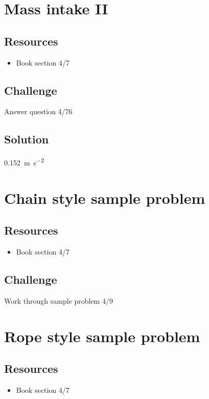 \newpage
\section{Mass intake II}

\subsection*{Resources}
\begin{itemize}
    \item Book section 4/7
\end{itemize}

\subsection*{Challenge}
Answer question 4/76

\subsection*{Solution}
\SI{0.152}{\meter\per\square\second}




\newpage
\section{Chain style sample problem}

\subsection*{Resources}
\begin{itemize}
    \item Book section 4/7
\end{itemize}

\subsection*{Challenge}
Work through sample problem 4/9




\newpage
\section{Rope style sample problem}

\subsection*{Resources}
\begin{itemize}
    \item Book section 4/7
\end{itemize}

